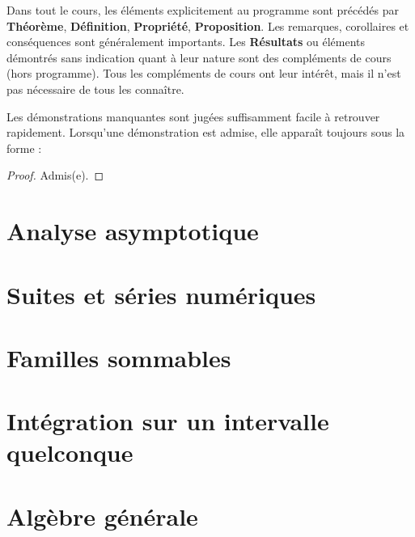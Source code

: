 \documentclass{report}
\begin{document}
\begin{minipage}{\textwidth}
Dans tout le cours, les éléments explicitement au programme sont précédés par \textbf{Théorème}, \textbf{Définition}, \textbf{Propriété}, \textbf{Proposition}. Les remarques, corollaires et conséquences sont généralement importants. Les \textbf{Résultats} ou éléments démontrés sans indication quant à leur nature sont des compléments de cours (hors programme). Tous les compléments de cours ont leur intérêt, mais il n'est pas nécessaire de tous les connaître.

Les démonstrations manquantes sont jugées suffisamment facile à retrouver rapidement. Lorsqu'une démonstration est admise, elle apparaît toujours sous la forme :

\begin{proof}
    Admis(e).
\end{proof}
\end{minipage}

\newpage

\pagestyle{main}

\chapter{Analyse asymptotique}



\chapter{Suites et séries numériques}



\chapter{Familles sommables}



\chapter{Intégration sur un intervalle quelconque}




\chapter{Algèbre générale}
\end{document}
